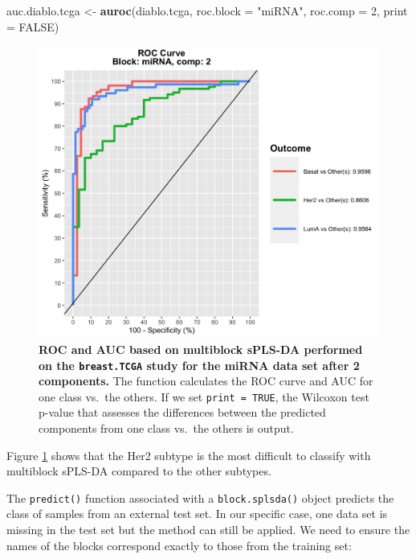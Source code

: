 \documentclass[]{book}
\newenvironment{Shaded}{\begin{snugshade}}{\end{snugshade}}
\newcommand{\KeywordTok}[1]{\textcolor[rgb]{0.13,0.29,0.53}{\textbf{#1}}}
\newcommand{\DataTypeTok}[1]{\textcolor[rgb]{0.13,0.29,0.53}{#1}}
\newcommand{\DecValTok}[1]{\textcolor[rgb]{0.00,0.00,0.81}{#1}}
\newcommand{\StringTok}[1]{\textcolor[rgb]{0.31,0.60,0.02}{#1}}
\newcommand{\OtherTok}[1]{\textcolor[rgb]{0.56,0.35,0.01}{#1}}
\newcommand{\NormalTok}[1]{#1}
\begin{document}
\begin{Shaded}
\begin{Highlighting}[]
\NormalTok{auc.diablo.tcga <-}\StringTok{ }\KeywordTok{auroc}\NormalTok{(diablo.tcga, }\DataTypeTok{roc.block =} \StringTok{"miRNA"}\NormalTok{, }\DataTypeTok{roc.comp =} \DecValTok{2}\NormalTok{,}
                   \DataTypeTok{print =} \OtherTok{FALSE}\NormalTok{)}
\end{Highlighting}
\end{Shaded}

\begin{figure}

{\centering \includegraphics[width=0.5\linewidth]{Figures/DIABLO/diablo-auroc-1} 

}

\caption{\textbf{ROC and AUC based on multiblock sPLS-DA
performed on the \texttt{breast.TCGA} study for the miRNA data set after
2 components.} The function calculates the ROC curve and AUC for one
class vs.~the others. If we set \texttt{print\ =\ TRUE}, the Wilcoxon
test p-value that assesses the differences between the predicted
components from one class vs.~the others is output.}\label{fig:diablo-auroc}
\end{figure}








Figure \ref{fig:diablo-auroc} shows that the Her2 subtype is the most
difficult to classify with multiblock sPLS-DA compared to the other
subtypes.

The \texttt{predict()} function associated with a
\texttt{block.splsda()} object predicts the class of samples from an
external test set. In our specific case, one data set is missing in the
test set but the method can still be applied. We need to ensure the
names of the blocks correspond exactly to those from the training set:
\end{document}

